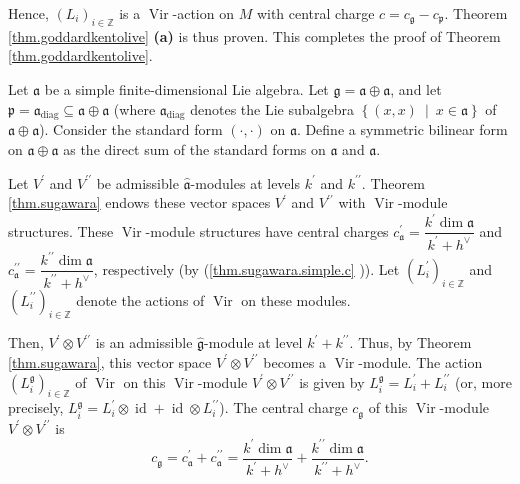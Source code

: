 \documentclass[etingof-lie.tex]{subfiles}
\begin{document}
Hence, $\left(  L_{i}\right)  _{i\in\mathbb{Z}}$ is a $\operatorname*{Vir}%
$-action on $M$ with central charge $c=c_{\mathfrak{g}}-c_{\mathfrak{p}}$.
Theorem \ref{thm.goddardkentolive} \textbf{(a)} is thus proven. This completes
the proof of Theorem \ref{thm.goddardkentolive}.

\begin{example}
Let $\mathfrak{a}$ be a simple finite-dimensional Lie algebra. Let
$\mathfrak{g}=\mathfrak{a}\oplus\mathfrak{a}$, and let $\mathfrak{p}%
=\mathfrak{a}_{\operatorname*{diag}}\subseteq\mathfrak{a}\oplus\mathfrak{a}$
(where $\mathfrak{a}_{\operatorname*{diag}}$ denotes the Lie subalgebra
$\left\{  \left(  x,x\right)  \ \mid\ x\in\mathfrak{a}\right\}  $ of
$\mathfrak{a}\oplus\mathfrak{a}$). Consider the standard form $\left(
\cdot,\cdot\right)  $ on $\mathfrak{a}$. Define a symmetric bilinear form on
$\mathfrak{a}\oplus\mathfrak{a}$ as the direct sum of the standard forms on
$\mathfrak{a}$ and $\mathfrak{a}$.

Let $V^{\prime}$ and $V^{\prime\prime}$ be admissible $\widehat{\mathfrak{a}}%
$-modules at levels $k^{\prime}$ and $k^{\prime\prime}$. Theorem
\ref{thm.sugawara} endows these vector spaces $V^{\prime}$ and $V^{\prime
\prime}$ with $\operatorname*{Vir}$-module structures. These
$\operatorname*{Vir}$-module structures have central charges $c_{\mathfrak{a}%
}^{\prime}=\dfrac{k^{\prime}\dim\mathfrak{a}}{k^{\prime}+h^{\vee}}$ and
$c_{\mathfrak{a}}^{\prime\prime}=\dfrac{k^{\prime\prime}\dim\mathfrak{a}%
}{k^{\prime\prime}+h^{\vee}}$, respectively (by (\ref{thm.sugawara.simple.c}%
)). Let $\left(  L_{i}^{\prime}\right)  _{i\in\mathbb{Z}}$ and $\left(
L_{i}^{\prime\prime}\right)  _{i\in\mathbb{Z}}$ denote the actions of
$\operatorname*{Vir}$ on these modules.

Then, $V^{\prime}\otimes V^{\prime\prime}$ is an admissible
$\widehat{\mathfrak{g}}$-module at level $k^{\prime}+k^{\prime\prime}$. Thus,
by Theorem \ref{thm.sugawara}, this vector space $V^{\prime}\otimes
V^{\prime\prime}$ becomes a $\operatorname*{Vir}$-module. The action $\left(
L_{i}^{\mathfrak{g}}\right)  _{i\in\mathbb{Z}}$ of $\operatorname*{Vir}$ on
this $\operatorname*{Vir}$-module $V^{\prime}\otimes V^{\prime\prime}$ is
given by $L_{i}^{\mathfrak{g}}=L_{i}^{\prime}+L_{i}^{\prime\prime}$ (or, more
precisely, $L_{i}^{\mathfrak{g}}=L_{i}^{\prime}\otimes\operatorname*{id}%
+\operatorname*{id}\otimes L_{i}^{\prime\prime}$). The central charge
$c_{\mathfrak{g}}$ of this $\operatorname*{Vir}$-module $V^{\prime}\otimes
V^{\prime\prime}$ is
\[
c_{\mathfrak{g}}=c_{\mathfrak{a}}^{\prime}+c_{\mathfrak{a}}^{\prime\prime
}=\dfrac{k^{\prime}\dim\mathfrak{a}}{k^{\prime}+h^{\vee}}+\dfrac
{k^{\prime\prime}\dim\mathfrak{a}}{k^{\prime\prime}+h^{\vee}}.
\]



\end{example}
\end{document}
